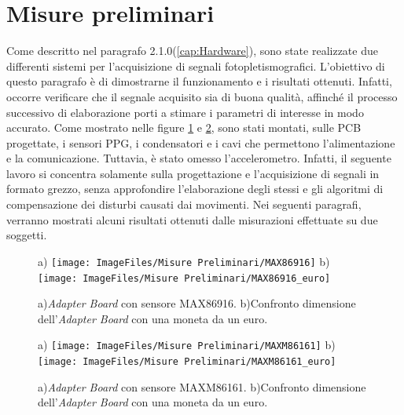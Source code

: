 \clearpage

\section{Misure preliminari}

Come descritto nel paragrafo 2.1.0(\ref{cap:Hardware}), sono state realizzate due differenti sistemi per l'acquisizione di segnali fotopletismografici. L'obiettivo di questo paragrafo è di dimostrarne il funzionamento e i risultati ottenuti. Infatti, occorre verificare che il segnale acquisito sia di buona qualità, affinché il processo successivo di elaborazione porti a stimare i parametri di interesse in modo accurato. Come mostrato nelle figure \ref{fig:foto_moduli_MAX86916} e \ref{fig:foto_moduli_MAXM86161}, sono stati montati, sulle PCB progettate, i sensori PPG, i condensatori e i cavi che permettono l'alimentazione e la comunicazione. Tuttavia, è stato omesso l'accelerometro. Infatti, il seguente lavoro si concentra solamente sulla progettazione e l'acquisizione di segnali in formato grezzo, senza approfondire l'elaborazione degli stessi e gli algoritmi di compensazione dei disturbi causati dai movimenti. Nei seguenti paragrafi, verranno mostrati alcuni risultati ottenuti dalle misurazioni effettuate su due soggetti.

\begin{figure}[bh]
	\centering
	a)
	\texttt{[image: ImageFiles/Misure Preliminari/MAX86916]}
	b)
	\texttt{[image: ImageFiles/Misure Preliminari/MAX86916\_euro]}
	\caption{a)\textit{Adapter Board} con sensore MAX86916. b)Confronto dimensione dell'\textit{Adapter Board} con una moneta da un euro.}
	\label{fig:foto_moduli_MAX86916}
\end{figure}

\begin{figure}[bh]
	\centering
	a)
	\texttt{[image: ImageFiles/Misure Preliminari/MAXM86161]}
	b)
	\texttt{[image: ImageFiles/Misure Preliminari/MAXM86161\_euro]}
	\caption{a)\textit{Adapter Board} con sensore MAXM86161. b)Confronto dimensione dell'\textit{Adapter Board} con una moneta da un euro.}
	\label{fig:foto_moduli_MAXM86161}
\end{figure}

